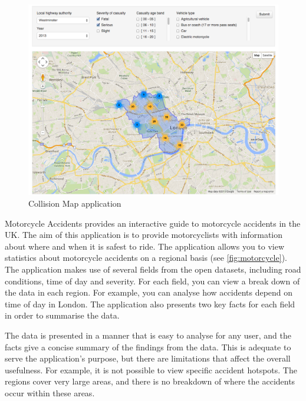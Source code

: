 \documentclass[authoryearcitations]{UoYCSproject}
\begin{document}
\begin{figure}
	\includegraphics[scale=0.3]{collisionmap}
	\caption{Collision Map application}
	\label{fig:collisionmap}
\end{figure}

Motorcycle Accidents \citep{Mceinsurance} provides an interactive guide to motorcycle accidents in the UK. The aim of this application is to provide motorcyclists with information about where and when it is safest to ride. The application allows you to view statistics about motorcycle accidents on a regional basis (see \autoref{fig:motorcycle}). The application makes use of several fields from the open datasets, including road conditions, time of day and severity. For each field, you can view a break down of the data in each region. For example, you can analyse how accidents depend on time of day in London. The application also presents two key facts for each field in order to summarise the data.

The data is presented in a manner that is easy to analyse for any user, and the facts give a concise summary of the findings from the data. This is adequate to serve the application's purpose, but there are limitations that affect the overall usefulness. For example, it is not possible to view specific accident hotspots. The regions cover very large areas, and there is no breakdown of where the accidents occur within these areas.
\end{document}

